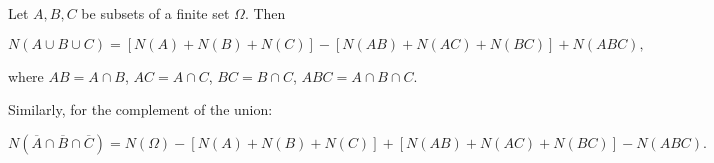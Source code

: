 Let $A, B, C$ be subsets of a finite set $\Omega$. Then

$$N(A \cup B \cup C) = [N(A) + N(B) + N(C)] - [N(AB) + N(AC) + N(BC)] + N(ABC),$$

where $AB = A \cap B$, $AC = A \cap C$, $BC = B \cap C$, $ABC = A \cap B \cap C$.

Similarly, for the complement of the union:

$$N(\overline{A} \cap \overline{B} \cap \overline{C}) = N(\Omega) - [N(A) + N(B) + N(C)] + [N(AB) + N(AC) + N(BC)] - N(ABC).$$
